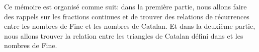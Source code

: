 Ce mémoire est organisé comme suit: dans la première partie, nous allons faire des rappels sur les fractions continues et de
trouver des relations de récurrences entre les nombres de Fine et les nombres de Catalan. Et dans la deuxième partie, nous
allons trouver la relation entre les triangles de Catalan défini dans \cite{Desantis} et les nombres de Fine.








